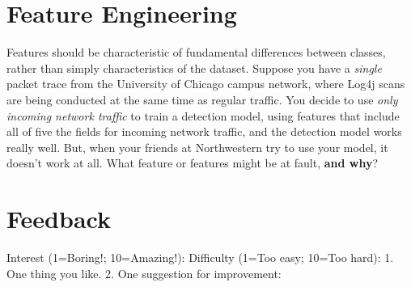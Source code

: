 \eprob


\section*{Feature Engineering}

Features should be characteristic of fundamental differences between classes, rather than
simply characteristics of the dataset. Suppose you have a {\em single} packet
trace from the University of Chicago campus network, where Log4j scans are
being conducted at the same time as regular traffic.
You decide to use {\em only incoming network traffic} to train a detection model, using
features that include all of five the fields for incoming network
traffic, and the detection model works really well. But, when your friends at
Northwestern try
to use your model, it doesn't work at all. What feature or features might be at fault,
{\bf and why}?

\eprob

\section*{Feedback}
Interest (1=Boring!; 10=Amazing!):
Difficulty (1=Too easy; 10=Too hard):
\eprob
{}
1. One thing you like. 2. One suggestion for improvement:

\eprob

